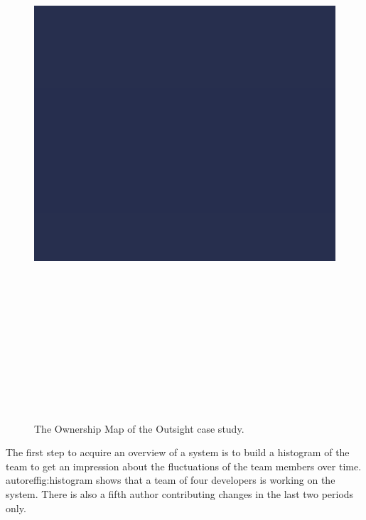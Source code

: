 \begin{figure}[htbp]
\begin{center}
\includegraphics[height=21.3cm]{outsight}
\caption{The Ownership Map of the Outsight case study.}
\label{fig:casestudy-outsight}
\end{center}
\end{figure}

The first step to acquire an overview of a system is to build a histogram of the team to get an impression about the fluctuations of the team members over time. autoref{fig:histogram} shows that a team of four developers is working on the system. There is also a fifth author contributing changes in the last two periods only.



